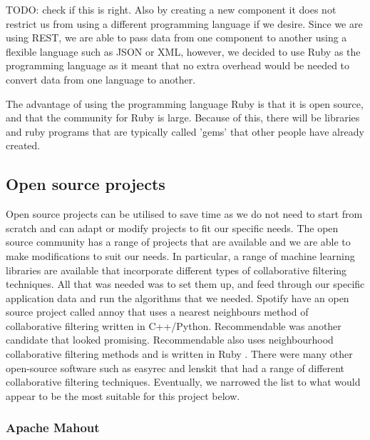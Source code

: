 TODO: check if this is right.
Also by creating a new component it does not restrict us from using a different programming language if we desire. Since we are using REST, we are able to pass data from one component to another using a flexible language such as JSON or XML, however, we decided to use Ruby as the programming language as it meant that no extra overhead would be needed to convert data from one language to another. 

The advantage of using the programming language Ruby is that it is open source, and that the community for Ruby is large. Because of this, there will be libraries and ruby programs that are typically called 'gems' that other people have already created. 

\subsection{Open source projects}

Open source projects can be utilised to save time as we do not need to start from scratch and can adapt or modify projects to fit our specific needs. The open source community has a range of projects that are available and we are able to make modifications to suit our needs. In particular, a range of machine learning libraries are available that incorporate different types of collaborative filtering techniques. All that was needed was to set them up, and feed through our specific application data and run the algorithms that we needed. Spotify have an open source project called annoy \cite{annoy} that uses a nearest neighbours method of collaborative filtering written in C++/Python. Recommendable was another candidate that looked promising. Recommendable also uses neighbourhood collaborative filtering methods and is written in Ruby \cite{recommendable}. There were many other open-source software such as easyrec \cite{easyrec} and lenskit \cite{lenskit} that had a range of different collaborative filtering techniques. Eventually, we narrowed the list to what would appear to be the most suitable for this project below. 
\subsubsection{Apache Mahout}

